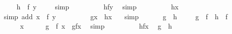 \begin{isabellebody}
\ \isamarkupfalse%
\ {\isachardoublequoteopen}{\isachardot}{\isachardot}{\isachardot}\ {\isacharequal}\ {\isacharparenleft}h\ {\isasymcirc}\ f{\isacharparenright}\ {\isacharparenleft}y{\isacharparenright}{\isachardoublequoteclose}\ \isamarkupfalse%
\ {}\ \isamarkupfalse%
\ simp\isanewline
\ \ \ \ \isamarkupfalse%
\ \isamarkupfalse%
\ {\isachardoublequoteopen}{\isachardot}{\isachardot}{\isachardot}\ {\isacharequal}\ h{\isacharparenleft}f{\isacharparenleft}y{\isacharparenright}{\isacharparenright}{\isachardoublequoteclose}\ \isamarkupfalse%
\ simp\isanewline
\ \ \ \ \isamarkupfalse%
\ \isamarkupfalse%
\ {\isachardoublequoteopen}{\isachardot}{\isachardot}{\isachardot}\ {\isacharequal}\ h{\isacharparenleft}x{\isacharparenright}{\isachardoublequoteclose}\ \isamarkupfalse%
\ {}\ \ \ \isamarkupfalse%
\ {\isacharparenleft}simp\ add{\isacharcolon}\ {\isacartoucheopen}x\ {\isacharequal}\ f\ y{\isacartoucheclose}{\isacharparenright}\isanewline
\ \ \ \ \isamarkupfalse%
\ \isamarkupfalse%
\ \ {\isachardoublequoteopen}\ g{\isacharparenleft}x{\isacharparenright}\ {\isacharequal}\ h{\isacharparenleft}x{\isacharparenright}\ {\isachardoublequoteclose}\ \isamarkupfalse%
\ simp\isanewline
\ \ \isamarkupfalse%
\isanewline
{}\isamarkupfalse%
\isanewline
\ \ \isamarkupfalse%
\ {\isachardoublequoteopen}g\ {\isacharequal}\ h{\isachardoublequoteclose}\ \isanewline
\ \ \isamarkupfalse%
\ {\isachardoublequoteopen}g\ {\isasymcirc}\ f\ {\isacharequal}\ h\ {\isasymcirc}\ f{\isachardoublequoteclose}\isanewline
\ \ \isamarkupfalse%
\isanewline
\ \ \ \ \isamarkupfalse%
\ x\isanewline
\ \ \ \ \isamarkupfalse%
\ {\isachardoublequoteopen}{\isacharparenleft}g\ {\isasymcirc}\ f{\isacharparenright}\ x\ {\isacharequal}\ g{\isacharparenleft}f{\isacharparenleft}x{\isacharparenright}{\isacharparenright}{\isachardoublequoteclose}\ \isamarkupfalse%
\ simp\isanewline
\ \ \ \ \isamarkupfalse%
\ \isamarkupfalse%
\ {\isachardoublequoteopen}{\isasymdots}\ {\isacharequal}\ h{\isacharparenleft}f{\isacharparenleft}x{\isacharparenright}{\isacharparenright}{\isachardoublequoteclose}\ \isamarkupfalse%
\ {\isacharbackquoteopen}g\ {\isacharequal}\ h{\isacharbackquoteclose}\ \isamarkupfalse%

\end{isabellebody}
